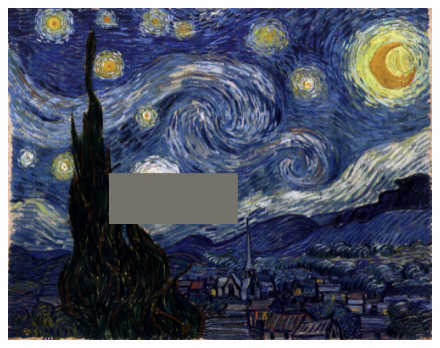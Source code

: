 \documentclass[12pt]{article}
\begin{document}
\begin{figure}[htb]
{    \includegraphics[scale=0.33]{Images/Gogh/input_3.png}}
  \hfill
\end{figure}
\end{document}
